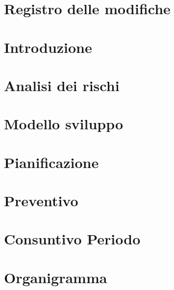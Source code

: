 \documentclass[a4paper, oneside, openany, dvipsnames, table]{article}
\begin{document}
    \copertina{}
    
    \section*{Registro delle modifiche}\label{sec:Registro-modifiche}
    
    
    \newpage
    \tableofcontents
    
    \newpage
    \listoftables
    
    \newpage
    \listoffigures
    
    \newpage
    \section{Introduzione}\label{sec:Introduzione}
    

    \newpage
    \section{Analisi dei rischi}\label{sec:Analisi-rischi}
    

    \newpage
    \section{Modello sviluppo}\label{sec:Modello-sviluppo}
    

    \newpage
    \section{Pianificazione}\label{sec:Pianificazione}
    

    \newpage
    \section{Preventivo}\label{sec:Preventivo}
    

    \newpage
    \section{Consuntivo Periodo}\label{sec:Consuntivo-periodo}
    

    \newpage
    \section{Organigramma}\label{sec:Organigramma}
    
\end{document}
